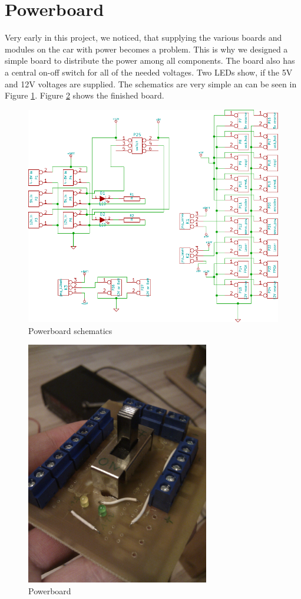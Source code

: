 \documentclass[a4paper
               ,10pt
               ,DIV=10 %
               ,BCOR=0.3cm
               ,pagesize %
               ,headings=small
               ,bibtotoc
               ]
               {scrartcl}
\begin{document}
\section{Powerboard}

Very early in this project, we noticed, that supplying the various boards and modules on the car with power becomes a problem.
This is why we designed a simple board to distribute the power among all components.
The board also has a central on-off switch for all of the needed voltages.
Two LEDs show, if the 5V and 12V voltages are supplied.
The schematics are very simple an can be seen in Figure \ref{figpowerboardscm}. Figure \ref{figpowerboardr} shows the finished board.

\begin{figure}[H]
\begin{center}
\includegraphics[width=0.7\linewidth]{pic/powerboard}
\caption{Powerboard schematics}
\label{figpowerboardscm}
\end{center}
\end{figure}

\begin{figure}[H]
\begin{center}
\includegraphics[width=8cm]{pic/powerboardr.jpg}
\caption{Powerboard}
\label{figpowerboardr}
\end{center}
\end{figure}
\end{document}
